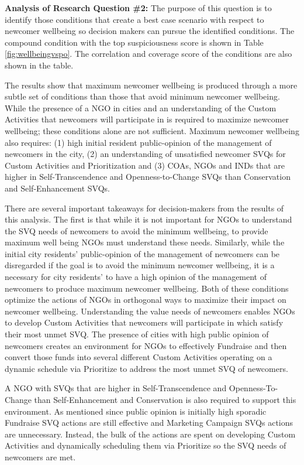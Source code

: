 \documentclass{scspaperproc}
\theoremstyle{scsthe}
\begin{document}
{\bf Analysis of Research Question \#2:} The purpose of this question is to identify those conditions that create a best case scenario with respect to newcomer wellbeing so decision makers can pursue the identified conditions. The compound condition with the top suspiciousness score is shown in Table \ref{fig:wellbeingvspo}. The correlation and coverage score of the conditions are also shown in the table. 

The results show that maximum newcomer wellbeing is produced through a more subtle set of conditions than those that avoid minimum newcomer wellbeing. While the presence of a NGO in cities and an understanding of the Custom Activities that newcomers will participate in is required to maximize newcomer wellbeing; these conditions alone are not sufficient. Maximum newcomer wellbeing also requires: (1) high initial resident public-opinion of the management of newcomers in the city, (2) an understanding of unsatisfied newcomer SVQs for Custom Activities and Prioritization and (3) COAs, NGOs and INDs that are higher in Self-Transcendence and Openness-to-Change SVQs than Conservation and Self-Enhancement SVQs.

There are several important takeaways for decision-makers from the results of this analysis. The first is that while it is not important for NGOs to understand the SVQ needs of newcomers to avoid the minimum wellbeing, to provide maximum well being NGOs must understand these needs. Similarly, while the initial city residents' public-opinion of the management of newcomers can be disregarded if the goal is to avoid the minimum newcomer wellbeing, it is a necessary for city residents' to have a high opinion of the management of newcomers to produce maximum newcomer wellbeing. Both of these conditions optimize the actions of NGOs in orthogonal ways to maximize their impact on newcomer wellbeing. Understanding the value needs of newcomers enables NGOs to develop Custom Activities that newcomers will participate in which satisfy their most unmet SVQ. The presence of cities with high public opinion of newcomers creates an environment for NGOs to effectively Fundraise and then convert those funds into several different Custom Activities operating on a dynamic schedule via Prioritize to address the most unmet SVQ of newcomers. 

A NGO with SVQs that are higher in Self-Transcendence and Openness-To-Change than Self-Enhancement and Conservation is also required to support this environment. As mentioned since public opinion is initially high sporadic Fundraise SVQ actions are still effective and Marketing Campaign SVQs actions are unnecessary. Instead, the bulk of the actions are spent on developing Custom Activities and dynamically scheduling them via Prioritize so the SVQ needs of newcomers are met. 
\end{document}
